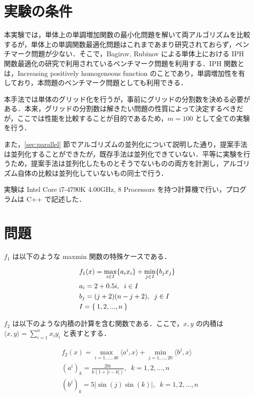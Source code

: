 \documentclass[a4paper,11pt]{jreport}
\begin{document}
\section{実験の条件}

本実験では，単体上の単調増加関数の最小化問題を解いて両アルゴリズムを比較するが，単体上の単調関数最適化問題はこれまであまり研究されておらず，ベンチマーク問題が少ない．そこで，Bagirov, Rubinov \cite{bagirov} による単体上における IPH 関数最適化の研究で利用されているベンチマーク問題を利用する．IPH 関数とは，Increasing positively homogeneous function のことであり，単調増加性を有しており，本問題のベンチマーク問題としても利用できる．\par
本手法では単体のグリッド化を行うが，事前にグリッドの分割数を決める必要がある．本来，グリッドの分割数は解きたい問題の性質によって決定するべきだが，ここでは性能を比較することが目的であるため，$ m = 100 $ として全ての実験を行う．\par
また，\ref{sec:parallel} 節でアルゴリズムの並列化について説明した通り，提案手法は並列化することができたが，既存手法は並列化できていない．平等に実験を行うため，提案手法は並列化したものとそうでないものの両方を計測し，アルゴリズム自体の比較は並列化していないもの同士で行う．\par
実験は Intel Core i7-4790K 4.00GHz, 8 Processors を持つ計算機で行い，プログラムは C++ で記述した．\par

\section{問題}

$ f_1 $ は以下のような maxmin 関数の特殊ケースである．\par

\begin{align*}
& f_1(x) = \max_{i \in I} \{a_i x_i \} + \min_{j \in I} \{b_j x_j \} \\
& a_i = 2 + 0.5 i, \;\; i \in I \\
& b_j = (j + 2) (n - j + 2), \;\; j \in I \\
& I = \Set{1, 2, ..., n}
\end{align*}

$ f_2 $ は以下のような内積の計算を含む関数である．ここで，$ x, y $ の内積は $ \langle x, y \rangle = \sum_{i = 1}^{n} x_i y_i $ と表すとする．\par

\begin{align*}
& f_2(x) = \max_{i = 1, ..., 40} \langle a^i, x \rangle + \min_{j = 1, ..., 20} \langle b^j, x \rangle \\
& (a^i)_k = \frac{20i}{k(1 + | i - k |)}, \;\; k = 1, 2, ..., n \\
& (b^j)_k = 5 | \sin{(j)} \sin{(k)} |, \;\; k = 1, 2, ..., n
\end{align*}
\end{document}
